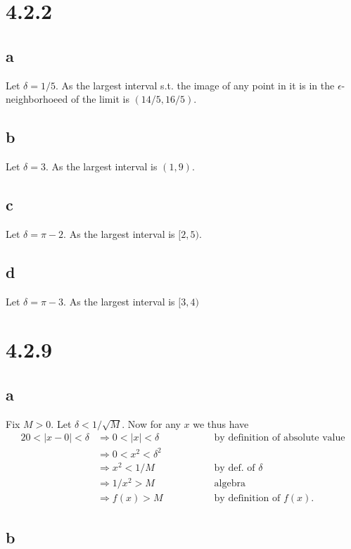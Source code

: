 \documentclass[10pt]{article}
\begin{document}
\section*{4.2.2}

\subsection*{a}
Let $\delta = 1/5.$ As the largest interval s.t. the image of any point in it is in the $\epsilon$-neighborhoeed of the limit is $(14/5,16/5).$

\subsection*{b}
Let $\delta=3.$ As the largest interval is $(1,9).$
\subsection*{c} %
Let $\delta = \pi-2.$ As the largest interval is $[2,5).$
\subsection*{d}
Let $\delta = \pi-3.$ As the largest interval is $[3,4)$

\section*{4.2.9}

\subsection*{a}

Fix $M>0.$ Let $\delta < 1/\sqrt{M}.$ Now for any $x$ we thus have
\begin{alignat*}{2}
    0<|x-0|<\delta &\Rightarrow 0<|x|<\delta \qquad\qquad&&\text{by definition of absolute value}\\
    & \Rightarrow 0 < x^2 < \delta^2\\
    & \Rightarrow x^2 < 1/M &&\text{by def. of }\delta\\
    & \Rightarrow 1/x^2 > M &&\text{algebra}\\
    & \Rightarrow f(x) > M &&\text{by definition of }f(x).
\end{alignat*}

\subsection*{b}
\end{document}
